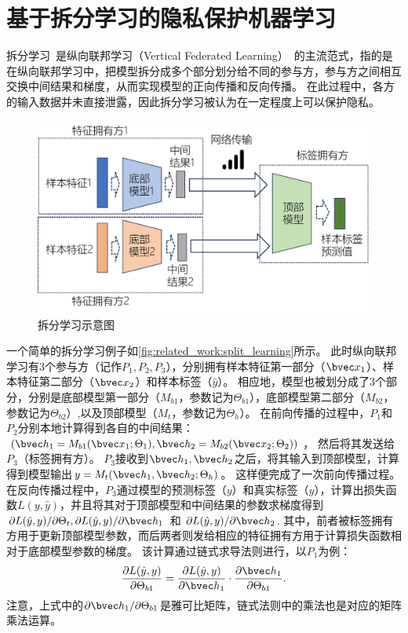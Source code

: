 \section{基于拆分学习的隐私保护机器学习}
%
拆分学习~\cite{vepakomma2018split,poirot2019split}是纵向联邦学习（Vertical Federated Learning）~\cite{liu2024vertical}的主流范式，指的是在纵向联邦学习中，把模型拆分成多个部分划分给不同的参与方，参与方之间相互交换中间结果和梯度，从而实现模型的正向传播和反向传播。
%
在此过程中，各方的输入数据并未直接泄露，因此拆分学习被认为在一定程度上可以保护隐私。

\begin{figure}[h]
    \centering
    \includegraphics[width=0.8\linewidth]{Z_Resources/拆分学习示意图.png}
    \caption{拆分学习示意图}
    \label{fig:related_work:split_learning}
\end{figure}

一个简单的拆分学习例子如\autoref{fig:related_work:split_learning}所示。
%
此时纵向联邦学习有3个参与方（记作$P_1, P_2, P_3$），分别拥有样本特征第一部分（$\bvec x_1$）、样本特征第二部分（$\bvec x_2$）和样本标签（$\hat y$）。
%
相应地，模型也被划分成了3个部分，分别是底部模型第一部分（$M_{b1}$，参数记为$\Theta_{b1}$），底部模型第二部分（$M_{b2}$，参数记为$\Theta_{b2}$）,以及顶部模型（$M_t$，参数记为$\Theta_h$）。
%
在前向传播的过程中，$P_1$和$P_2$分别本地计算得到各自的中间结果：
$
    \left(
        \bvec h_1 = M_{b1}(\bvec x_1;\Theta_1),
        \bvec h_2 = M_{b2}(\bvec x_2;\Theta_2)
    \right)
$，
然后将其发送给$P_3$（标签拥有方）。
%
$P_3$接收到$\bvec h_1, \bvec h_2$之后，将其输入到顶部模型，计算得到模型输出$y = M_t(\bvec h_1, \bvec h_2; \Theta_h)$。
%
这样便完成了一次前向传播过程。
%
%
在反向传播过程中，$P_3$通过模型的预测标签（$y$）和真实标签（$\hat y$），计算出损失函数$L(y, \hat y)$，并且将其对于顶部模型和中间结果的参数求梯度得到${\partial L(\hat y, y)}/{\partial \Theta_t}, {\partial L(\hat y, y)}/{\partial \bvec h_1}$ 和 ${\partial L(\hat y, y)}/{\partial \bvec h_2}$.
%
其中，前者被标签拥有方用于更新顶部模型参数，而后两者则发给相应的特征拥有方用于计算损失函数相对于底部模型参数的梯度。
%
该计算通过链式求导法则进行，以$P_1$为例：
\begin{equation}
    \dfrac{\partial L(\hat y, y)}{\partial \Theta_{b1}} = \dfrac{\partial L(\hat y, y)}{\partial \bvec h_1}\cdot \dfrac{\partial \bvec h_1}{\partial \Theta_{b1}}.
\end{equation}
%
注意，上式中的${\partial \bvec h_1}/{\partial \Theta_{b1}}$是雅可比矩阵，链式法则中的乘法也是对应的矩阵乘法运算。

